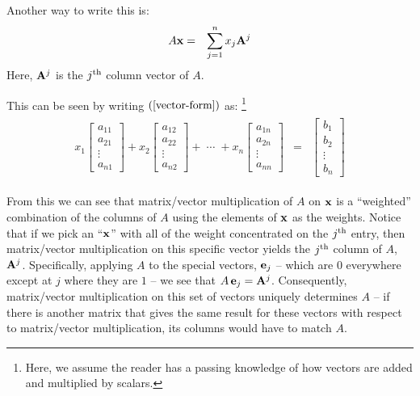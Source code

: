 \documentclass{article}
\begin{document}
Another way to write this is:
\begin{eqnarray}
A {\bf x} & = & \sum_{j=1}^n x_j {\bf A}^j
\end{eqnarray}
Here, ${\bf A}^j$ is the $j^{\rm th}$ column vector of $A$. 

This can be seen by writing $(\ref{vector-form})$ as:%
\footnote{Here, we assume the reader has a passing knowledge of how vectors 
are added and multiplied by scalars.}
\begin{eqnarray}
  \begin{array}{ccc}
	  x_1 \left[ \begin{array}{c}
			  a_{11} \\
			  a_{21} \\
		  	  \vdots \\
			  a_{n1}
		     \end{array}
	      \right]
		  +  
	  x_2 \left[ \begin{array}{c}
			  a_{12} \\
			  a_{22} \\
		  	  \vdots \\
			  a_{n2}
		     \end{array}
	      \right]
		  + \; \cdots \;
		  + 
	  x_n \left[ \begin{array}{c}
			  a_{1n} \\
			  a_{2n} \\
		  	  \vdots \\
			  a_{nn}
		     \end{array}
	      \right]
	  & = &
                \left[
                \begin{array}{c}
                  b_1    \\
                  b_2    \\
                  \vdots \\
                  b_n
                \end{array}
  \right] 
  \end{array} \label{matrix-form3}
\end{eqnarray}

From this we can see that matrix/vector multiplication of $A$ on ${\bf x}$ is
a ``weighted'' combination of the columns of $A$ using the elements of ${\bf x}$
as the weights. Notice that if we pick an ``${\bf x}$'' with all of the weight 
concentrated on the $j^{\rm th}$ entry, then matrix/vector multiplication on this 
specific vector yields the $j^{\rm th}$ 
column of $A$, ${\bf A}^j$. Specifically, applying $A$ to the special
vectors, ${\bf e}_j$
-- which are $0$ everywhere except at $j$ where they are $1$ --
we see that $A \, {\bf e}_j = {\bf A}^j$. 
Consequently, matrix/vector multiplication on this set of vectors
uniquely determines $A$
-- if there is another matrix that gives the same result for these vectors with
respect to matrix/vector multiplication, 
its columns would have to match $A$.
\end{document}
